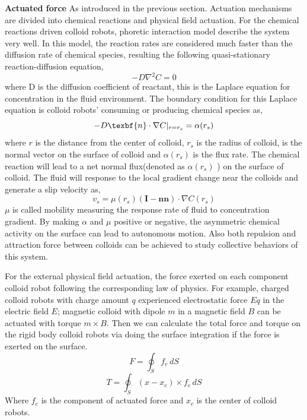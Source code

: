\textbf{Actuated force} As introduced in the previous section. Actuation mechanisms are divided into chemical reactions and physical field actuation. For the chemical reactions driven colloid robots, phoretic interaction  model describe the system very well. \cite{golestanian2007,najafi2004simple,golestanian2005propulsion,golestanian2019phoretic} In this model, the reaction rates are considered much faster than the diffusion rate of chemical species, resulting the following   
quasi-stationary reaction-diffusion equation,
\begin{equation}
    -D\nabla^2 C=0
\end{equation}
where D is the diffusion coefficient of reactant, this is the Laplace equation for concentration in the fluid environment. The boundary condition for this Laplace equation is  colloid robots' consuming or producing chemical species as,
\begin{equation}
    -D \texbf{n}\cdot \nabla C|_{r=r_s}=\alpha(r_s)
\end{equation}
where $r$ is the distance from the center of colloid, $r_s$ is the radius of colloid,  is the normal vector on the surface of colloid and $\alpha(r_s)$ is the flux rate. The chemical reaction will lead to a net normal flux(denoted as $\alpha(r_s)$ ) on the surface of colloid. The fluid will response to the local gradient change near the colloids and generate a slip velocity as,
\begin{equation}
    v_s=\mu(r_s)(\textbf{I}-\textbf{n}\textbf{n})\cdot \nabla C(r_s)
\end{equation}
$\mu$ is called mobility measuring the response rate of fluid to concentration gradient. By making $\alpha$ and $\mu$ positive or negative, the asymmetric chemical activity on the surface can lead to autonomous motion.  Also both repulsion and attraction force between colloids can be achieved to study collective behaviors of this system. \cite{michelin2015autophoretic}

For the external physical field actuation, the force exerted on each component colloid robot following the corresponding law of physics. For example, charged colloid robots with charge amount $q$ experienced electrostatic force $Eq$ in the electric field $E$; magnetic colloid with dipole $m$ in a magnetic field $B$ can be actuated with torque $m\times B$.
Then we can calculate the total force and torque on the rigid body colloid robots via doing the surface integration if the force is exerted on the surface.
\begin{equation}
    F=\oint_S f_e \,dS
\end{equation}
\begin{equation}
    T=\oint_S (x-x_c)\times f_e \,dS
\end{equation}
Where $f_e$  is the component of actuated force and $x_c$ is the center of colloid robots.

